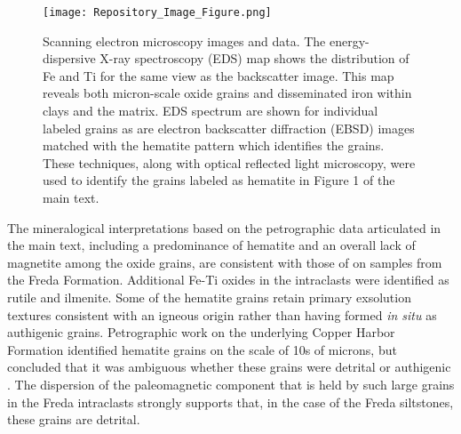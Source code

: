 \documentclass[11pt,letterpaper]{article}
\begin{document}
\begin{figure}[!ht]
\centering
\noindent\texttt{[image: Repository\_Image\_Figure.png]}
\caption{\small{Scanning electron microscopy images and data. The energy-dispersive X-ray spectroscopy (EDS) map shows the distribution of Fe and Ti for the same view as the backscatter image. This map reveals both micron-scale oxide grains and disseminated iron within clays and the matrix. EDS spectrum are shown for individual labeled grains as are electron backscatter diffraction (EBSD) images matched with the hematite pattern which identifies the grains. These techniques, along with optical reflected light microscopy, were used to identify the grains labeled as hematite in Figure 1 of the main text.}}
\label{fig:sem_images}
\end{figure} 

The mineralogical interpretations based on the petrographic data articulated in the main text, including a predominance of hematite and an overall lack of magnetite among the oxide grains, are consistent with those of \cite{Vincenz1968b} on samples from the Freda Formation. Additional Fe-Ti oxides in the intraclasts were identified as rutile and ilmenite. Some of the hematite grains retain primary exsolution textures consistent with an igneous origin rather than having formed \textit{in situ} as authigenic grains. Petrographic work on the underlying Copper Harbor Formation identified hematite grains on the scale of 10s of microns, but concluded that it was ambiguous whether these grains were detrital or authigenic \citep{Elmore1982a}. The dispersion of the paleomagnetic component that is held by such large grains in the Freda intraclasts strongly supports that, in the case of the Freda siltstones, these grains are detrital.



\end{document}

